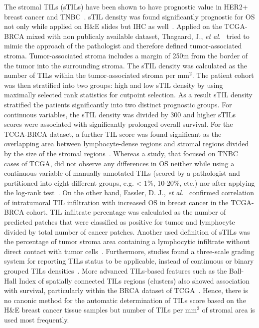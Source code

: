 The stromal TILs (sTILs) have been shown to have prognostic value in HER2+ breast cancer and TNBC~\cite{kos2020pitfalls}. 
sTIL density was found significantly prognostic for OS not only while applied on H\&E slides but IHC as well~\cite{kapil2021breast}.
Applied on the TCGA-BRCA mixed with non publicaly available dataset, Thagaard, J., \textit{et al.}~\cite{thagaard2021automated} tried to mimic the approach of the pathologist and therefore defined tumor-associated stroma. Tumor-associated stroma includes a margin of 250\textmu m from the border of the tumor into the surrounding stroma. The sTIL density was calculated as the number of TILs within the tumor-associated stroma per mm$^2$. The patient cohort was then stratified into two groups: high and low sTIL density by using maximally selected rank statistics for cutpoint selection. As a result sTIL density stratified the patients significantly into two distinct prognostic groups.  For continuous variables, the sTIL density was divided by 300 and higher sTILs scores were associated with significantly prolonged overall survival. For the TCGA-BRCA dataset, a further TIL score was found significant as the overlapping area between lymphocyte-dense regions and stromal regions divided by the size of the stromal regions~\cite{sun2021computational}.  Whereas a study, that focused on TNBC cases of TCGA, did not observe any differences in OS neither while using a continuous variable of manually annotated TILs (scored by a pathologist and partitioned into eight different groups, e.g. < 1\%, 10-20\%, etc.) nor after applying the log-rank test~\cite{craven2021cibersort}.
On the other hand, Fassler, D. J., \textit{et al.}~\cite{fassler2022spatial} confirmed correlation of intratumoral TIL infiltration with increased OS in breast cancer in the TCGA-BRCA cohort. TIL infiltrate percentage was calculated as the number of predicted patches that were classified as positive for tumor and lymphocyte divided by total number of cancer patches.
Another used definition of sTILs was the percentage of tumor stroma area containing a lymphocytic infiltrate without direct contact with tumor cells~\cite{meng2018distribution}.
Furthermore, studies found a three-scale grading system for reporting TILs status to be applicable, instead of continuous or binary grouped TILs densities~\cite{kotoula2016tumors}. More advanced TILs-based features such as the Ball-Hall Index of spatially connected TILs regions (clusters) also showed association with survival, particularly within the BRCA dataset of TCGA~\cite{saltz2018spatial}. 
Hence, there is no canonic method for the automatic determination of TILs score based on the H\&E breast cancer tissue samples but number of TILs per mm$^2$ of stromal area is used most frequently.
